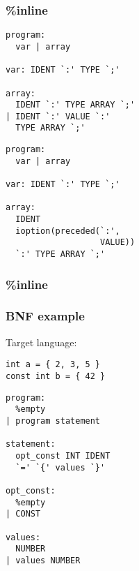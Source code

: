 \begin{frame}
  \frametitle{\%inline}
  \usebox{\codebox}
\end{frame}


\begin{lrbox}{\codebox}
  \begin{tcolorbox}[title=\centering{\%inline}\\Bison\hspace{0.45\linewidth} Menhir,sidebyside]%
  \begin{lstlisting}
program:
  var | array

var: IDENT `:' TYPE `;'

array:
  IDENT `:' TYPE ARRAY `;'
| IDENT `:' VALUE `:'
  TYPE ARRAY `;'
\end{lstlisting}
\tcblower%
  \begin{lstlisting}
program:
  var | array

var: IDENT `:' TYPE `;'

array:
  IDENT
  ioption(preceded(`:',
                   VALUE))
  `:' TYPE ARRAY `;'
  \end{lstlisting}
  \end{tcolorbox}
\end{lrbox}

\begin{frame}
  \frametitle{\%inline}
  \usebox{\codebox}
\end{frame}

\begin{frame}[fragile]
  \frametitle{BNF example}
  Target language:
  \begin{verbatim}
int a = { 2, 3, 5 }
const int b = { 42 }
\end{verbatim}
\end{frame}

\begin{lrbox}{\codebox}
  \begin{tcolorbox}[title=\centering{BNF}\\Bison\hspace{0.45\linewidth} Menhir,sidebyside]%
  \begin{lstlisting}
program:
  %empty
| program statement

statement:
  opt_const INT IDENT
  `=' `{' values `}'

opt_const:
  %empty
| CONST

values:
  NUMBER
| values NUMBER
\end{lstlisting}
\tcblower
  \end{tcolorbox}
\end{lrbox}

